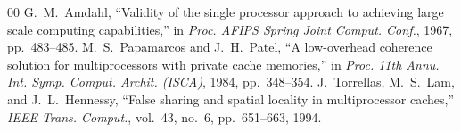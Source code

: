 \documentclass[conference]{IEEEtran}
\begin{document}

\begin{thebibliography}{00}
 G.~M.~Amdahl, ``Validity of the single processor approach to achieving large scale computing capabilities,'' in \textit{Proc. AFIPS Spring Joint Comput. Conf.}, 1967, pp.~483--485.
 M.~S.~Papamarcos and J.~H.~Patel, ``A low-overhead coherence solution for multiprocessors with private cache memories,'' in \textit{Proc. 11th Annu. Int. Symp. Comput. Archit. (ISCA)}, 1984, pp.~348--354.
 J.~Torrellas, M.~S.~Lam, and J.~L.~Hennessy, ``False sharing and spatial locality in multiprocessor caches,'' \textit{IEEE Trans. Comput.}, vol.~43, no.~6, pp.~651--663, 1994.
\end{thebibliography}
\end{document}
